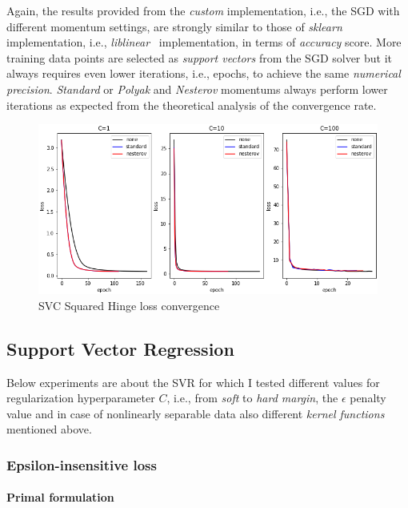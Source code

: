 Again, the results provided from the \emph{custom} implementation, i.e., the SGD with different momentum settings, are strongly similar to those of \emph{sklearn} implementation, i.e., \emph{liblinear}~\cite{fan2008liblinear} implementation, in terms of \emph{accuracy} score. More training data points are selected as \emph{support vectors} from the SGD solver but it always requires even lower iterations, i.e., epochs, to achieve the same \emph{numerical precision}. \emph{Standard} or \emph{Polyak} and \emph{Nesterov} momentums always perform lower iterations as expected from the theoretical analysis of the convergence rate.

\begin{figure}[H]
	\centering
	\includegraphics[scale=0.6]{img/svc_squared_hinge_loss_history}
	\caption{SVC Squared Hinge loss convergence}
	\label{fig:svc_squared_hinge_loss_history}
\end{figure}

\pagebreak

\subsection{Support Vector Regression}

Below experiments are about the SVR for which I tested different values for regularization hyperparameter $C$, i.e., from \emph{soft} to \emph{hard margin}, the $\epsilon$ penalty value and in case of nonlinearly separable data also different \emph{kernel functions} mentioned above.

\subsubsection{Epsilon-insensitive loss}

\paragraph{Primal formulation}

